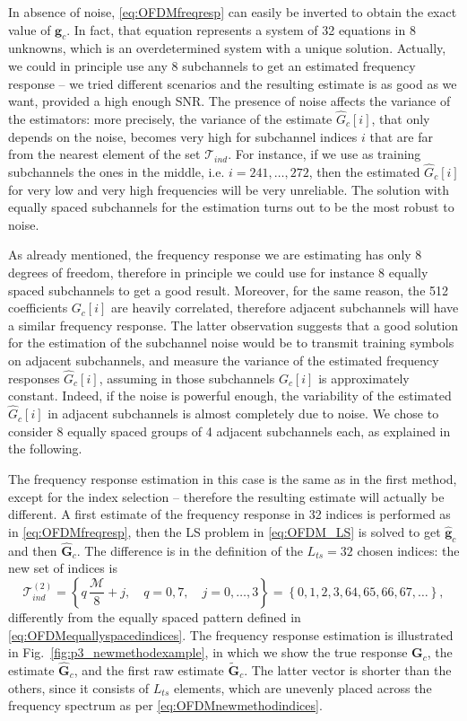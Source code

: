 \documentclass[10pt]{article}
\newcommand{\ofdM} {\mathcal{M}}
\begin{document}
In absence of noise, \eqref{eq:OFDMfreqresp} can easily be inverted to obtain the exact value of $\mathbf{g}_c$. In fact, that equation represents a system of 32 equations in 8 unknowns, which is an overdetermined system with a unique solution. Actually, we could in principle use any 8 subchannels to get an estimated frequency response -- we tried different scenarios and the resulting estimate is as good as we want, provided a high enough SNR. The presence of noise affects the variance of the estimators: more precisely, the variance of the estimate $\hat{G}_c[i]$, that only depends on the noise, becomes very high for subchannel indices $i$ that are far from the nearest element of the set $\mathcal{T}_{ind}$. For instance, if we use as training subchannels the ones in the middle, i.e. $i = 241,\ldots,272$, then the estimated $\hat{G}_c[i]$ for very low and very high frequencies will be very unreliable. The solution with equally spaced subchannels for the estimation turns out to be the most robust to noise.

As already mentioned, the frequency response we are estimating has only 8 degrees of freedom, therefore in principle we could use for instance 8 equally spaced subchannels to get a good result. Moreover, for the same reason, the 512 coefficients $G_c[i]$ are heavily correlated, therefore adjacent subchannels will have a similar frequency response. The latter observation suggests that a good solution for the estimation of the subchannel noise would be to transmit training symbols on adjacent subchannels, and measure the variance of the estimated frequency responses $\hat{G}_c[i]$, assuming in those subchannels $G_c[i]$ is approximately constant. Indeed, if the noise is powerful enough, the variability of the estimated $\hat{G}_c[i]$ in adjacent subchannels is almost completely due to noise. We chose to consider 8 equally spaced groups of 4 adjacent subchannels each, as explained in the following.

The frequency response estimation in this case is the same as in the first method, except for the index selection -- therefore the resulting estimate will actually be different. A first estimate of the frequency response in 32 indices is performed as in \eqref{eq:OFDMfreqresp}, then the LS problem in \eqref{eq:OFDM_LS} is solved to get $\mathbf{\hat{g}}_c$ and then $\mathbf{\hat{G}}_c$. The difference is in the definition of the $L_{ts}\!=\!32$ chosen indices: the new set of indices is
\begin{equation}
	\mathcal{T}_{ind}^{(2)} = \left\{q \, \frac{\ofdM}{8} + j, \quad q = 0,7, \quad j=0,\ldots,3 \right\}  = \left\{ 0, 1, 2, 3, 64, 65, 66, 67, \dots \right\},
	\label{eq:OFDMnewmethodindices}
\end{equation}
differently from the equally spaced pattern defined in \eqref{eq:OFDMequallyspacedindices}. The frequency response estimation is illustrated in Fig.~\ref{fig:p3_newmethodexample}, in which we show the true response $\mathbf{G}_c$, the estimate $\mathbf{\hat{G}}_c$, and the first raw estimate $\mathbf{\tilde{G}}_c$. The latter vector is shorter than the others, since it consists of $L_{ts}$ elements, which are unevenly placed across the frequency spectrum as per \eqref{eq:OFDMnewmethodindices}.
\end{document}

